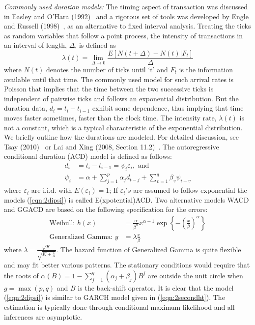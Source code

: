 \noindent \textit{Commonly used duration models:} The timing aspect of transaction was discussed in Easley and O'Hara (1992)~\cite{easley1992} and a rigorous set of tools was developed by Engle and Russell (1998)~\cite{engle1998}, as an alternative to fixed interval analysis. Treating the ticks as random variables that follow a point process, the intensity of transactions in an interval of length, $\Delta$, is defined as
	\begin{equation}\label{eqn:2lambda}
	\lambda(t) = \lim\limits_{\Delta \rightarrow 0}\frac{E[N(t+\Delta) - N(t)|F_t]}{\Delta}
	\end{equation}
where $N(t)$ denotes the number of ticks until `t' and $F_t$ is the information available until that time. The commonly used model for such arrival rates is Poisson that implies that the time between the two successive ticks is independent of pairwise ticks and follows an exponential distribution. But the duration data, $d_i = t_i - t_{i-1}$ exhibit some dependence, thus implying that time moves faster sometimes, faster than the clock time. The intensity rate, $\lambda(t)$ is not a constant, which is a typical characteristic of the exponential distribution. We briefly outline how the durations are modeled. For detailed discussion, see Tsay (2010)~\cite{tsay} or Lai and Xing (2008, Section 11.2)~\cite{lai1}. The autoregressive conditional duration (ACD) model is defined as follows:
	\begin{equation}\label{eqn:2dipsi}
	\begin{split}
	d_i&= t_i - t_{i-1} = \psi_i\varepsilon_i, \text{ and} \\
	\psi_i&= \alpha + \sum_{j=1}^p\alpha_j d_{t-j} + \sum_{v=1}^q\beta_v\psi_{i-v}
	\end{split}
	\end{equation}
where $\varepsilon_i$ are i.i.d. with $E(\varepsilon_i) = 1$; If $\varepsilon_t's$ are assumed to follow exponential the models (\ref{eqn:2dipsi}) is called E(xpotential)ACD. Two alternative models WACD and GGACD are based on the following specification for the errors:
	\[
	\begin{split}
	\text{Weibull: }h(x) &= \frac{\alpha}{\beta^{\alpha}}x^{\alpha-1}\exp\left\{-(\frac{x}{\beta})^{\alpha}\right\} \\
	\text{Generalized Gamma: } y &= \lambda\frac{x}{\beta}
	\end{split}
	\]
where $\lambda = \frac{\sqrt{K}}{\sqrt{K+\frac{1}{\alpha}}}$. The hazard function of Generalized Gamma is quite flexible and may fit better various patterns. The stationary conditions would require that the roots of $\alpha(B) = 1 - \sum_{j=1}^q(\alpha_j+\beta_j)B^j$ are outside the unit circle when $g= \max(p,q)$ and $B$ is the back-shift operator. It is clear that the model (\ref{eqn:2dipsi}) is similar to GARCH model given in (\ref{eqn:2secondht}). The estimation is typically done through conditional maximum likelihood and all inferences are asymptotic.


